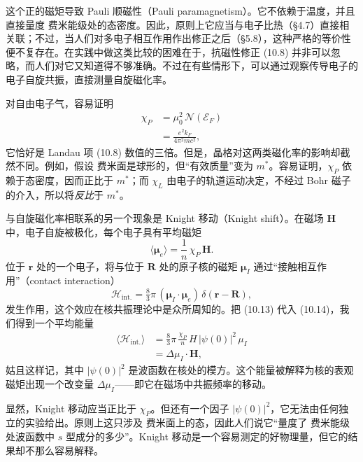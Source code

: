 这个正的磁矩导致 Pauli 顺磁性（Pauli paramagnetism）。它不依赖于温度，并且直接量度 费米能级处的态密度。因此，原则上它应当与电子比热（§4.7）直接相关联；不过，当人们对多电子相互作用作出修正之后（§5.8），这种严格的等价性便不复存在。在实践中做这类比较的困难在于，抗磁性修正 (10.8) 并非可以忽略，而人们对它又知道得不够准确。不过在有些情形下，可以通过观察传导电子的电子自旋共振，直接测量自旋磁化率。

对自由电子气，容易证明
\begin{align*}
\chi_{P} &=\mu_{0}^{2}\,\mathcal{N}(\mathcal{E}_{F})\\
&=\frac{e^{2}k_{F}}{4\pi^{2}mc^{2}},
\tag{10.12}
\end{align*}
它恰好是 Landau 项 (10.8) 数值的三倍。但是，晶格对这两类磁化率的影响却截然不同。例如，假设 费米面是球形的，但“有效质量”变为 $m^{*}$。容易证明，$\chi_{P}$ 依赖于态密度，因而正比于 $m^{*}$；而 $\chi_{L}$ 由电子的轨道运动决定，不经过 Bohr 磁子的介入，所以将\emph{反比}于 $m^{*}$。

与自旋磁化率相联系的另一个现象是 Knight 移动（Knight shift）。在磁场 $\mathbf{H}$ 中，电子自旋被极化，每个电子具有平均磁矩
\begin{equation*}
\langle\boldsymbol{\mu}_{e}\rangle=\frac{1}{n}\,\chi_{P}\,\mathbf{H}.
\tag{10.13}
\end{equation*}
位于 $\mathbf{r}$ 处的一个电子，将与位于 $\mathbf{R}$ 处的原子核的磁矩 $\boldsymbol{\mu}_{I}$ 通过“接触相互作用”（contact interaction）
\begin{equation*}
\mathcal{H}_{\text{int.}}=\tfrac{8}{3}\pi\,(\boldsymbol{\mu}_{I}\cdot\boldsymbol{\mu}_{e})\,\delta(\mathbf{r}-\mathbf{R}),
\tag{10.14}
\end{equation*}
发生作用，这个效应在核共振理论中是众所周知的。把 (10.13) 代入 (10.14)，我们得到一个平均能量
\begin{align*}
\langle\mathcal{H}_{\text{int.}}\rangle &=\tfrac{8}{3}\pi\,\frac{\chi_{P}}{n}\,H\,|\psi(0)|^{2}\,\mu_{I}\\
&=\Delta\mu_{I}\cdot\mathbf{H},
\tag{10.15}
\end{align*}
姑且这样记，其中 $|\psi(0)|^{2}$ 是波函数在核处的模方。这个能量被解释为核的表观磁矩出现一个改变量 $\Delta\mu_{I}$——即它在磁场中共振频率的移动。

显然，Knight 移动应当正比于 $\chi_{P}$。但还有一个因子 $|\psi(0)|^{2}$，它无法由任何独立的实验给出。原则上这只涉及 费米面上的态，因此人们说它“量度了 费米能级处波函数中 $s$ 型成分的多少”。Knight 移动是一个容易测定的好物理量，但它的结果却不那么容易解释。

